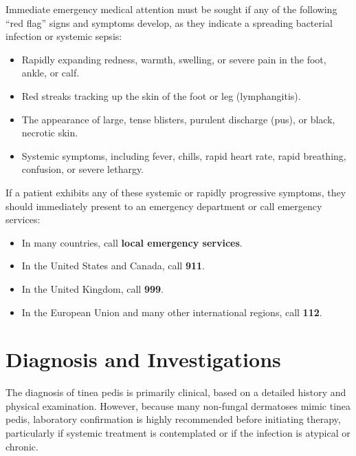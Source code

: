 Immediate emergency medical attention must be sought if any of the following ``red flag'' signs and symptoms develop, as they indicate a spreading bacterial infection or systemic sepsis:
\begin{itemize}
    \item Rapidly expanding redness, warmth, swelling, or severe pain in the foot, ankle, or calf.
    \item Red streaks tracking up the skin of the foot or leg (lymphangitis).
    \item The appearance of large, tense blisters, purulent discharge (pus), or black, necrotic skin.
    \item Systemic symptoms, including fever, chills, rapid heart rate, rapid breathing, confusion, or severe lethargy.
\end{itemize}

If a patient exhibits any of these systemic or rapidly progressive symptoms, they should immediately present to an emergency department or call emergency services:
\begin{itemize}
    \item In many countries, call \textbf{local emergency services}.
    \item In the United States and Canada, call \textbf{911}.
    \item In the United Kingdom, call \textbf{999}.
    \item In the European Union and many other international regions, call \textbf{112}.
\end{itemize}

\section*{Diagnosis and Investigations}
The diagnosis of tinea pedis is primarily clinical, based on a detailed history and physical examination. However, because many non-fungal dermatoses mimic tinea pedis, laboratory confirmation is highly recommended before initiating therapy, particularly if systemic treatment is contemplated or if the infection is atypical or chronic.

